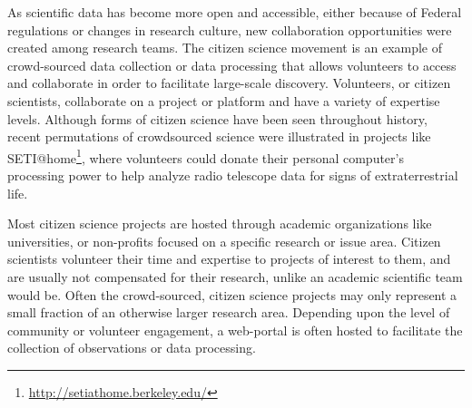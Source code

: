 As scientific data has become more open and accessible, either because of Federal regulations or changes in research culture, new collaboration opportunities were created among research teams. The citizen science movement is an example of crowd-sourced data collection or data processing that allows volunteers to access and collaborate in order to facilitate large-scale discovery. Volunteers, or citizen scientists, collaborate on a project or platform and have a variety of expertise levels. Although forms of citizen science have been seen throughout history, recent permutations of crowdsourced science were illustrated in projects like SETI@home\footnote{\url{http://setiathome.berkeley.edu/}}, where volunteers could donate their personal computer's processing power to help analyze radio telescope data for signs of extraterrestrial life. 

Most citizen science projects are hosted through academic organizations like universities, or non-profits focused on a specific research or issue area. Citizen scientists volunteer their time and expertise to projects of interest to them, and are usually not compensated for their research, unlike an academic scientific team would be. Often the crowd-sourced, citizen science projects may only represent a small fraction of an otherwise larger research area. Depending upon the level of community or volunteer engagement, a web-portal is often hosted to facilitate the collection of observations or data processing.
